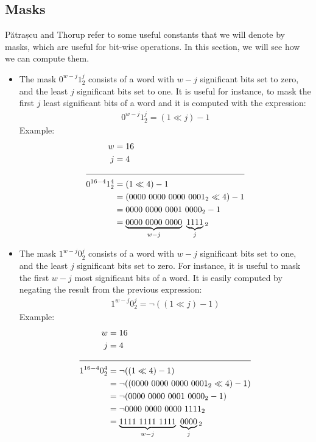 \subsection{Masks} \label{sec:masks}

Pătrașcu and Thorup refer to some useful constants that we will denote by masks, which are useful for bit-wise operations. In this section, we will see how we can compute them.

\begin{itemize}
    \item
    The mask $0^{w-j} 1^j_2$ consists of a word with $w-j$ significant bits set to zero, and the least $j$ significant bits set to one. It is useful for instance, to mask the first $j$ least significant bits of a word and it is computed with the expression:
    \begin{align*}
        0^{w-j} 1^j_2 = (1 \ll j) - 1
    \end{align*}
    Example:
    \begin{align*}
        w &= 16\\
        j &= 4\\
        \cline{1-2}
        0^{16-4} 1^4_2 &= (1 \ll 4) - 1\\
        &= (0000\ 0000\ 0000\ 0001_2 \ll 4) - 1\\
        &= 0000\ 0000\ 0001\ 0000_2 - 1\\
        &= \underbrace{0000\ 0000\ 0000}_{w-j}\ \underbrace{1111}_{j}{}_2
    \end{align*}
    
    \item
    The mask $1^{w-j} 0^j_2$ consists of a word with $w-j$ significant bits set to one, and the least $j$ significant bits set to zero. For instance, it is useful to mask the first $w - j$ most significant bits of a word. It is easily computed by negating the result from the previous expression:
    \begin{align*}
        1^{w-j} 0^j_2= \neg((1 \ll j) - 1)
    \end{align*}
    Example:
    \begin{align*}
        w &= 16\\
        j &= 4\\
        \cline{1-2}
        1^{16-4} 0^4_2 &= \neg((1 \ll 4) - 1)\\
        &= \neg((0000\ 0000\ 0000\ 0001_2 \ll 4) - 1)\\
        &= \neg(0000\ 0000\ 0001\ 0000_2 - 1)\\
        &= \neg0000\ 0000\ 0000\ 1111_2\\
        &= \underbrace{1111\ 1111\ 1111}_{w-j}\ \underbrace{0000}_{j}{}_2
    \end{align*}
\end{itemize}

